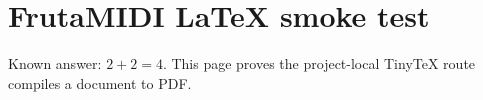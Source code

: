 \documentclass{article}
\begin{document}
\section*{FrutaMIDI LaTeX smoke test}
Known answer: $2+2=4$. This page proves the project-local TinyTeX route compiles a document to PDF.
\end{document}
